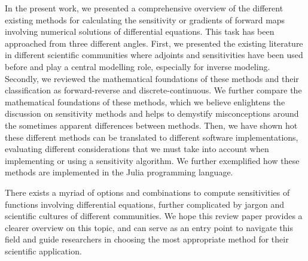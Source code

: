 In the present work, we presented a comprehensive overview of the different existing methods for calculating the sensitivity or gradients of forward maps involving numerical solutions of differential equations.
This task has been approached from three different angles.
First, we presented the existing literature in different scientific communities where adjoints and sensitivities have been used before and play a central modelling role, especially for inverse modeling.
Secondly, we reviewed the mathematical foundations of these methods and their classification as forward-reverse and discrete-continuous.
We further compare the mathematical foundations of these methods, which we believe enlightens the discussion on sensitivity methods and helps to demystify  misconceptions around the sometimes apparent differences between methods.  
Then, we have shown hot these different methods can be translated to different software implementations, evaluating different considerations that we must take into account when implementing or using a sensitivity algorithm. 
We further exemplified how these methods are implemented in the Julia programming language. 

There exists a myriad of options and combinations to compute sensitivities of functions involving differential equations, further complicated by jargon and scientific cultures of different communities. 
We hope this review paper provides a clearer overview on this topic, and can serve as an entry point to navigate this field and guide researchers in choosing the most appropriate method for their scientific application.



